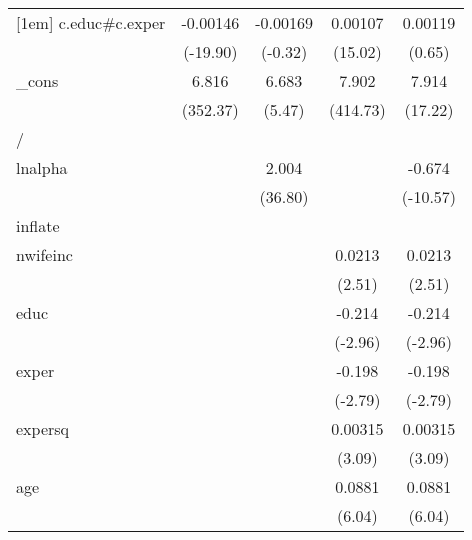 {\begin{tabular}{l*{4}{c}}
[1em]
c.educ#c.exper&    -0.00146\sym{***}&    -0.00169         &     0.00107\sym{***}&     0.00119         \\
            &    (-19.90)         &     (-0.32)         &     (15.02)         &      (0.65)         \\
[1em]
\_cons      &       6.816\sym{***}&       6.683\sym{***}&       7.902\sym{***}&       7.914\sym{***}\\
            &    (352.37)         &      (5.47)         &    (414.73)         &     (17.22)         \\
\hline
/           &                     &                     &                     &                     \\
lnalpha     &                     &       2.004\sym{***}&                     &      -0.674\sym{***}\\
            &                     &     (36.80)         &                     &    (-10.57)         \\
\hline
inflate     &                     &                     &                     &                     \\
nwifeinc    &                     &                     &      0.0213\sym{*}  &      0.0213\sym{*}  \\
            &                     &                     &      (2.51)         &      (2.51)         \\
[1em]
educ        &                     &                     &      -0.214\sym{**} &      -0.214\sym{**} \\
            &                     &                     &     (-2.96)         &     (-2.96)         \\
[1em]
exper       &                     &                     &      -0.198\sym{**} &      -0.198\sym{**} \\
            &                     &                     &     (-2.79)         &     (-2.79)         \\
[1em]
expersq     &                     &                     &     0.00315\sym{**} &     0.00315\sym{**} \\
            &                     &                     &      (3.09)         &      (3.09)         \\
[1em]
age         &                     &                     &      0.0881\sym{***}&      0.0881\sym{***}\\
            &                     &                     &      (6.04)         &      (6.04)         \\

\end{tabular}}

